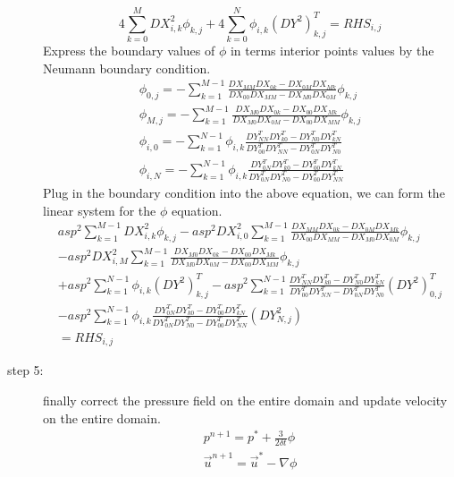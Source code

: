 \documentclass[12pt]{article}
\begin{document}
\begin{description}
\begin{equation}
4\sum_{k=0}^{M}DX^{2}_{i,k}\phi_{k,j} + 4\sum_{k=0}^{N}\phi_{i,k}(DY^{2})^{T}_{k,j}= RHS_{i,j}
\end{equation}
Express the boundary values of $\phi$ in terms interior points values by the Neumann boundary condition.\\
\begin{align}
\phi_{0,j} = 
-\sum_{k=1}^{M-1}\frac{DX_{MM}DX_{0k}-DX_{0M}DX_{Mk}}
{DX_{00}DX_{MM}-DX_{M0}DX_{0M}} \phi_{k,j}\\
\phi_{M,j} = 
-\sum_{k=1}^{M-1}\frac{DX_{M0}DX_{0k}-DX_{00}DX_{Mk}}
{DX_{M0}DX_{0M}-DX_{00}DX_{MM}} \phi_{k,j}\\
\phi_{i,0} = 
-\sum_{k=1}^{N-1}\phi_{i,k}\frac{DY^{T}_{NN}DY^{T}_{k0}-DY^{T}_{N0}DY^{T}_{kN}}
{DY^{T}_{00}DY^{T}_{NN}-DY^{T}_{0N}DY^{T}_{N0}} \\
\phi_{i,N} = 
-\sum_{k=1}^{N-1}\phi_{i,k}\frac{DY^{T}_{0N}DY^{T}_{k0}-DY^{T}_{00}DY^{T}_{kN}}
{DY^{T}_{0N}DY^{T}_{N0}-DY^{T}_{00}DY^{T}_{NN}}
\end{align}
Plug in the boundary condition into the above equation, we can form the linear system for the $\phi$ equation.
\begin{align}
  asp^{2}\sum_{k=1}^{M-1}DX^{2}_{i,k}\phi_{k,j}
  -asp^{2}DX^{2}_{i,0}\sum_{k=1}^{M-1}\frac{DX_{MM}DX_{0k}-DX_{0M}DX_{Mk}}
{DX_{00}DX_{MM}-DX_{M0}DX_{0M}} \phi_{k,j} \\
  -asp^{2}DX^{2}_{i,M}\sum_{k=1}^{M-1}\frac{DX_{M0}DX_{0k}-DX_{00}DX_{Mk}}
{DX_{M0}DX_{0M}-DX_{00}DX_{MM}} \phi_{k,j}\\
  + asp^{2}\sum_{k=1}^{N-1}\phi_{i,k}(DY^{2})^{T}_{k,j}
  -asp^{2}\sum_{k=1}^{N-1}\frac{DY^{T}_{NN}DY^{T}_{k0}-DY^{T}_{N0}DY^{T}_{kN}}
{DY^{T}_{00}DY^{T}_{NN}-DY^{T}_{0N}DY^{T}_{N0}}(DY^{2})^{T}_{0,j}\\
  -asp^{2}\sum_{k=1}^{N-1}\phi_{i,k}\frac{DY^{T}_{0N}DY^{T}_{k0}-DY^{T}_{00}DY^{T}_{kN}}
{DY^{T}_{0N}DY^{T}_{N0}-DY^{T}_{00}DY^{T}_{NN}}(DY^{2}_{N,j})\\
= RHS_{i,j}
\end{align}

\item[step 5:] finally correct the pressure field on the entire domain
and update velocity on the entire  domain.\\
\begin{align}
p^{n+1}={p}^{*} + \frac{3}{2\delta t}\phi  \\
\vec{u}^{n+1} = \vec{u}^{*} - \nabla \phi
\end{align}

\end{description}


\end{document}
